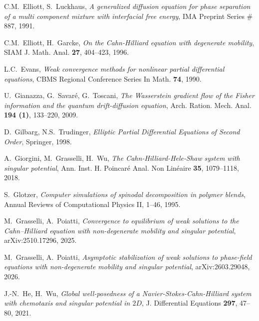 \documentclass[11pt,  reqno]{amsart}%
\theoremstyle{plain}
\theoremstyle{definition}
\theoremstyle{remark}
\numberwithin{equation}{section}
\begin{document}
\begin{thebibliography}{}

    C.M.~Elliott, S.~Luckhaus,
    \textit{A generalized diffusion equation for phase separation of a multi component mixture with interfacial free energy}, 
    IMA Preprint Series \# 887, 1991. 

    C.M.~Elliott, H.~Garcke,
    \textit{On the {C}ahn-{H}illiard equation with degenerate mobility},
     SIAM J. Math. Anal. \textbf{27}, 404--423, 1996.

    L.C.~Evans, 
    \textit{Weak convergence methods for nonlinear partial differential equations}, CBMS Regional Conference Series In Math. \textbf{74}, 1990.

    U.~Gianazza, G.~Savar{\'e}, G.~Toscani,
    \textit{The {W}asserstein gradient flow of the {F}isher information and the quantum drift-diffusion equation},
    Arch. Ration. Mech. Anal. \textbf{194 (1)}, 133--220, 2009.

    D.~Gilbarg, N.S.~Trudinger,
    \textit{Elliptic Partial Differential Equations of Second Order}, Springer, 1998.


   A.~Giorgini, M.~Grasselli, H.~Wu,
    \textit{The {C}ahn-{H}illiard-{H}ele-{S}haw system with singular potential}, Ann. Inst. H. Poincar{\'e} Anal. Non Lin{\'e}aire  \textbf{35}, 1079--1118, 2018.

S.~Glotzer, 
\textit{Computer simulations of spinodal decomposition in polymer blends},
Annual Reviews of Computational Physics II, 1--46, 1995.

M.~Grasselli, A.~Poiatti,
\textit{Convergence to equilibrium of weak solutions to the {C}ahn--{H}illiard equation with non-degenerate mobility and singular potential},
arXiv:2510.17296, 2025.

M.~Grasselli, A.~Poiatti,
\textit{Asymptotic stabilization of weak solutions to phase-field equations with non-degenerate mobility and singular potential},
arXiv:2603.29048, 2026.

 J.-N.~He, H.~Wu, 
   \textit{Global well-posedness of a {N}avier-{S}tokes-{C}ahn-{H}illiard system with chemotaxis and singular potential in $2D$}, 
 J. Differential  Equations \textbf{297}, 47--80, 2021.


\end{thebibliography}
\end{document}
